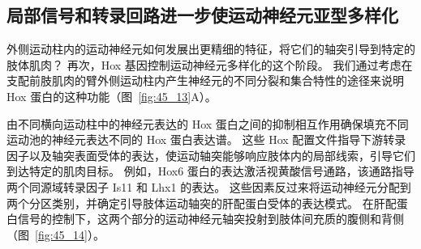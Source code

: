\subsection{局部信号和转录回路进一步使运动神经元亚型多样化}

外侧运动柱内的运动神经元如何发展出更精细的特征，将它们的轴突引导到特定的肢体肌肉？
再次，Hox 基因控制运动神经元多样化的这个阶段。
我们通过考虑在支配前肢肌肉的臂外侧运动柱内产生神经元的不同分裂和集合特性的途径来说明 Hox 蛋白的这种功能（图~\ref{fig:45_13}A）。


由不同横向运动柱中的神经元表达的 Hox 蛋白之间的抑制相互作用确保填充不同运动池的神经元表达不同的 Hox 蛋白表达谱。
这些 Hox 配置文件指导下游转录因子以及轴突表面受体的表达，使运动轴突能够响应肢体内的局部线索，引导它们到达特定的肌肉目标。
例如，Hox6 蛋白的表达激活视黄酸信号通路，该通路指导两个同源域转录因子 Is11 和 Lhx1 的表达。
这些因素反过来将运动神经元分配到两个分区类别，并确定引导肢体运动轴突的肝配蛋白受体的表达模式。
在肝配蛋白信号的控制下，这两个部分的运动神经元轴突投射到肢体间充质的腹侧和背侧（图~\ref{fig:45_14}）。


